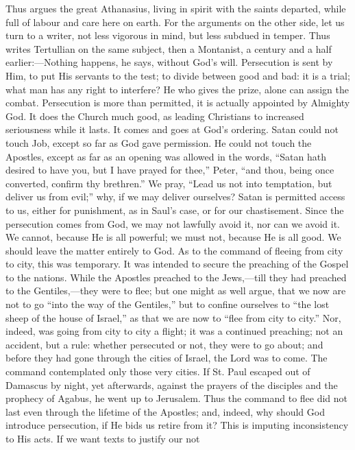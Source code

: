 Thus argues the great Athanasius, living in spirit with the saints
departed, while full of labour and care here on earth. For the
arguments on the other side, let us turn to a writer, not less
vigorous in mind, but less subdued in temper. Thus writes Tertullian
on the same subject, then a Montanist, a century and a half earlier:—Nothing
happens, he says, without God's will. Persecution is sent by Him, to
put His servants to the test; to divide between good and bad: it is a
trial; what man has any right to interfere? He who gives the prize,
alone can assign the combat. Persecution is more than permitted, it is
actually appointed by Almighty God. It does the Church much good, as
leading Christians to increased seriousness while it lasts. It comes
and goes at God's ordering. Satan could not touch Job, except so far
as God gave permission. He could not touch the Apostles, except as far
as an opening was allowed in the words, ``Satan hath desired to
have you, but I have prayed for thee,'' Peter, ``and thou,
being once converted, confirm thy brethren.'' We pray, ``Lead
us not into temptation, but deliver us from evil;'' why, if we may
deliver ourselves? Satan is permitted access to us, either for
punishment, as in Saul's case, or for our chastisement. Since the
persecution comes from God, we may not lawfully avoid it, nor can we
avoid it. We cannot, because He is all powerful; we must not, because
He is all good. We should leave the matter entirely to God. As to the
command of fleeing from city to city, this was temporary. It was
intended to secure the preaching of the Gospel to the nations. While
the Apostles preached to the Jews,—till they had preached to the
Gentiles,—they were to flee; but one might as well argue, that
we now are not to go ``into the way of the Gentiles,'' but to
confine ourselves to ``the lost sheep of the house of
Israel,'' as that we are now to ``flee from city to
city.'' Nor, indeed, was going from city to city a flight; it was
a continued preaching; not an accident, but a rule: whether persecuted
or not, they were to go about; and before they had gone through the
cities of Israel, the Lord was to come. The command contemplated only
those very cities. If St. Paul escaped out of Damascus by night, yet
afterwards, against the prayers of the disciples and the prophecy of
Agabus, he went up to Jerusalem. Thus the command to flee did not last
even through the lifetime of the Apostles; and, indeed, why should God
introduce persecution, if He bids us retire from it? This is imputing
inconsistency to His acts. If we want texts to justify our not
